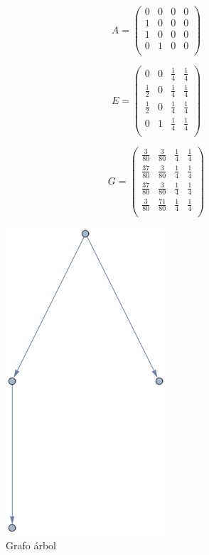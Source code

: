 \begin{equation}
    A = 
    \begin{pmatrix}
        0 & 0 & 0 & 0 \\
        1 & 0 & 0 & 0 \\
        1 & 0 & 0 & 0 \\
        0 & 1 & 0 & 0 \\
    \end{pmatrix}
\end{equation}

\begin{equation}
    E =
    \begin{pmatrix}
        0 & 0 & \frac{1}{4} & \frac{1}{4} \\
        \frac{1}{2} & 0 & \frac{1}{4} & \frac{1}{4} \\
        \frac{1}{2} & 0 & \frac{1}{4} & \frac{1}{4} \\
        0 & 1 & \frac{1}{4} & \frac{1}{4} \\
    \end{pmatrix}
\end{equation}

\begin{equation}
    G =
    \begin{pmatrix}
        \frac{3}{80} & \frac{3}{80} & \frac{1}{4} & \frac{1}{4} \\
        \frac{37}{80} & \frac{3}{80} & \frac{1}{4} & \frac{1}{4} \\
        \frac{37}{80} & \frac{3}{80} & \frac{1}{4} & \frac{1}{4} \\
        \frac{3}{80} & \frac{71}{80} & \frac{1}{4} & \frac{1}{4} \\
    \end{pmatrix}
\end{equation}

\begin{figure}[H]
    \centering
    \includegraphics[width=0.5\linewidth]{img/tree.png}
    \caption[Grafo árbol]{Grafo árbol}
    \label{fig:tree}
\end{figure}

